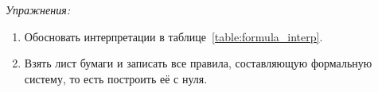 {\it Упражнения:}
\begin{enumerate}
	\item{}Обосновать интерпретации в таблице~\ref{table:formula_interp}.
	\item{}Взять лист бумаги и записать
	все правила, составляющую формальную систему, то есть построить её с нуля.
\end{enumerate}


